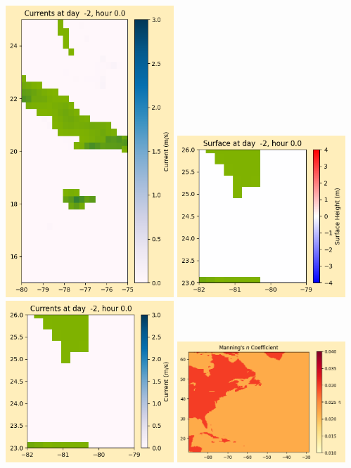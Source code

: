 \documentclass[11pt]{article}
\begin{document}
\includegraphics[width=0.475\textwidth]{frame0004fig1008.png}
\vskip 10pt 
\includegraphics[width=0.475\textwidth]{frame0004fig1009.png}
\includegraphics[width=0.475\textwidth]{frame0004fig1010.png}
\vskip 10pt 
\includegraphics[width=0.475\textwidth]{frame0004fig1011.png}
\end{document}
